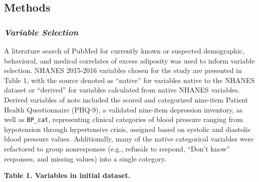 \documentclass[]{article}
\begin{document}
\hypertarget{methods}{%
\subsection{\texorpdfstring{\textbf{Methods}}{Methods}}\label{methods}}

\hypertarget{variable-selection}{%
\subsubsection{\texorpdfstring{\emph{Variable
Selection}}{Variable Selection}}\label{variable-selection}}

A literature search of PubMed for currently known or suspected
demographic, behavioral, and medical correlates of excess adiposity was
used to inform variable selection. NHANES 2015-2016 variables chosen for
the study are presented in Table 1, with the source denoted as
``native'' for variables native to the NHANES dataset or ``derived'' for
variables calculated from native NHANES variables. Derived variables of
note included the scored and categorized nine-item Patient Health
Questionnaire (PHQ-9), a validated nine-item depression inventory, as
well as \texttt{BP\_cat}, representing clinical categories of blood
pressure ranging from hypotension through hypertensive crisis, assigned
based on systolic and diastolic blood pressure values. Additionally,
many of the native categorical variables were refactored to group
nonresponses (e.g., refusals to respond, ``Don't know'' responses, and
missing values) into a single category.

\textbf{Table 1. Variables in initial dataset.}
\end{document}

